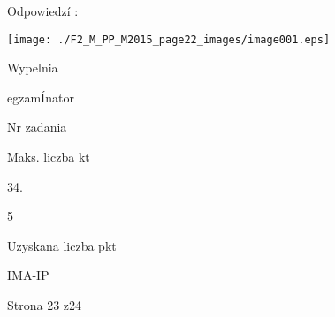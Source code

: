 \documentclass[a4paper,12pt]{article}
\begin{document}
Odpowiedzí :
\begin{center}
\texttt{[image: ./F2\_M\_PP\_M2015\_page22\_images/image001.eps]}
\end{center}
Wypelnia

egzamÍnator

Nr zadania

Maks. liczba kt

34.

5

Uzyskana liczba pkt

IMA-IP

Strona 23 z24
\end{document}
